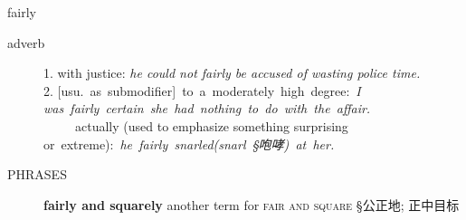 \documentclass[avery5372, grid]{flashcards}
\begin{document}
\begin{flashcard}{\Huge fairly}
\begin{description}
			
			
			
		\item[adverb] 
			
			1. with justice: \textit{he could not fairly be accused of wasting police time.}\\
			
			2. \mbox{[usu. as submodifier] to a moderately high degree: \textit{I}}\\
				\textit{\mbox{was fairly certain she had nothing to do with the affair.}}\\
			\ \ \ \ \textbullet\  actually (used to emphasize something surprising \mbox{or extreme): \textit{he fairly snarled\textnormal{(snarl  {\S 咆哮})} at her.}}
			
			
		\item[\textsc{PHRASES}] \textbf{fairly and squarely}  another term for \textsc{\B fair and square} {\S 公正地; 正中目标}
	\end{description}
\end{flashcard}






\end{document}
